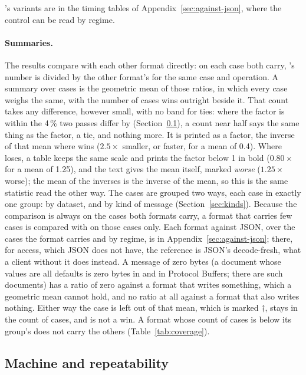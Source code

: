 \colbin{}'s variants are in the timing tables of
Appendix~\ref{sec:against-json}, where the control can be read by regime.

\paragraph{Summaries.} The results compare \colbin{} with each other format
directly: on each case both carry, \colbin{}'s number is divided by the
other format's for the same case and operation. A summary over cases is the
geometric mean of those ratios, in which every case weighs the same, with
the number of cases \colbin{} wins outright beside it. That count takes
any difference, however small, with no band for ties: where the factor is
within the 4\,\% two passes differ by (Section~\ref{sec:machine}), a count
near half says the same thing as the factor, a tie, and nothing more. It is printed as a
factor, the inverse of that mean where \colbin{} wins ($2.5\times$ smaller,
or faster, for a mean of 0.4). Where \colbin{} loses, a table keeps the same
scale and prints the factor below 1 in bold ($0.80\times$ for a mean of
1.25), and the text gives the mean itself, marked \emph{worse}
($1.25\times$ worse); the mean of the inverses is the inverse of the mean,
so this is the same statistic read the other way. The cases are
grouped two ways, each case in exactly one group: by dataset, and by kind of
message (Section~\ref{sec:kinds}). Because the comparison is always on the
cases both formats carry, a format that carries few cases is compared with
\colbin{} on those cases only. Each format against JSON, over the cases the
format carries and by regime, is in Appendix~\ref{sec:against-json}; there,
for access, which JSON does not have, the reference is JSON's decode-fresh,
what a client without it does instead. A message of zero bytes (a document
whose values are all defaults is zero bytes in \colbin{} and in Protocol
Buffers; there are  such documents) has a ratio of
zero against a format that writes something, which a geometric mean cannot
hold, and no ratio at all against a format that also writes nothing. Either
way the case is left out of that mean, which is marked $\dagger$, stays in
the count of cases, and is not a win. A format whose count of cases is
below its group's does not carry the others
(Table~\ref{tab:coverage}).

\FloatBarrier
\subsection{Machine and repeatability}
\label{sec:machine}

